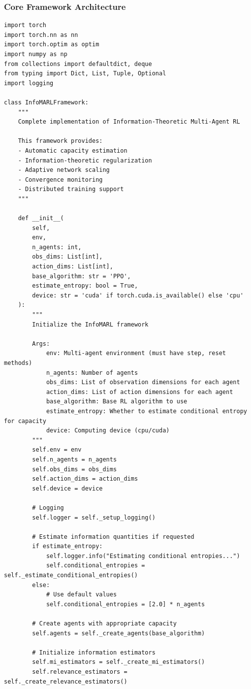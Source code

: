 \documentclass[10pt, letterpaper]{article}
\begin{document}
\subsubsection{Core Framework Architecture}

\begin{lstlisting}
import torch
import torch.nn as nn
import torch.optim as optim
import numpy as np
from collections import defaultdict, deque
from typing import Dict, List, Tuple, Optional
import logging

class InfoMARLFramework:
    """
    Complete implementation of Information-Theoretic Multi-Agent RL

    This framework provides:
    - Automatic capacity estimation
    - Information-theoretic regularization
    - Adaptive network scaling
    - Convergence monitoring
    - Distributed training support
    """

    def __init__(
        self,
        env,
        n_agents: int,
        obs_dims: List[int],
        action_dims: List[int],
        base_algorithm: str = 'PPO',
        estimate_entropy: bool = True,
        device: str = 'cuda' if torch.cuda.is_available() else 'cpu'
    ):
        """
        Initialize the InfoMARL framework

        Args:
            env: Multi-agent environment (must have step, reset methods)
            n_agents: Number of agents
            obs_dims: List of observation dimensions for each agent
            action_dims: List of action dimensions for each agent
            base_algorithm: Base RL algorithm to use
            estimate_entropy: Whether to estimate conditional entropy for capacity
            device: Computing device (cpu/cuda)
        """
        self.env = env
        self.n_agents = n_agents
        self.obs_dims = obs_dims
        self.action_dims = action_dims
        self.device = device

        # Logging
        self.logger = self._setup_logging()

        # Estimate information quantities if requested
        if estimate_entropy:
            self.logger.info("Estimating conditional entropies...")
            self.conditional_entropies = self._estimate_conditional_entropies()
        else:
            # Use default values
            self.conditional_entropies = [2.0] * n_agents

        # Create agents with appropriate capacity
        self.agents = self._create_agents(base_algorithm)

        # Initialize information estimators
        self.mi_estimators = self._create_mi_estimators()
        self.relevance_estimators = self._create_relevance_estimators()


\end{lstlisting}
\end{document}
